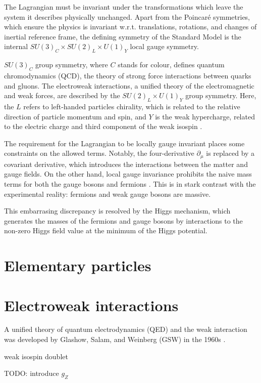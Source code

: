 The Lagrangian must be invariant under the transformations which leave the
system it describes physically unchanged. Apart from the Poincar\'e symmetries, which
ensure the physics is invariant w.r.t. translations, rotations, and changes of inertial
reference frame, the defining symmetry of the Standard Model is the internal
$SU(3)_C \times SU(2)_L \times U(1)_Y$ local gauge symmetry.

$SU(3)_C$ group symmetry, where $C$ stands for colour, defines quantum chromodynamics
(QCD), the theory of strong force interactions between quarks and gluons. The electroweak
interactions, a unified theory of the electromagnetic and weak forces, are described by
the $SU(2)_L \times U(1)_Y$ group symmetry. Here, the $L$ refers to left-handed particles
chirality, which is related to the relative direction of particle momentum and spin, and
$Y$ is the weak hypercharge, related to the electric charge and third component of the
weak isospin \cite{Thomson:2013zua}.

The requirement for the Lagrangian to be locally gauge invariant places some constraints
on the allowed terms. Notably, the four-derivative $\partial_\mu$ is replaced by a 
covariant derivative, which introduces the interactions between the matter and gauge
fields. On the other hand, local gauge invariance prohibits the naive mass terms for
both the gauge bosons and fermions \cite{Thomson:2013zua}. This is in stark contrast
with the experimental reality: fermions and weak gauge bosons are massive.

This embarrasing discrepancy is resolved by the Higgs mechanism, which generates the
masses of the fermions and gauge bosons by interactions to the non-zero Higgs field
value at the minimum of the Higgs potential.

\section{Elementary particles}

\section{Electroweak interactions}

A unified theory of quantum electrodynamics (QED) and the weak interaction was developed
by Glashow, Salam, and Weinberg (GSW) in the 1960s \cite{Thomson:2013zua}. 

weak isospin doublet

TODO: introduce $g_Z$

